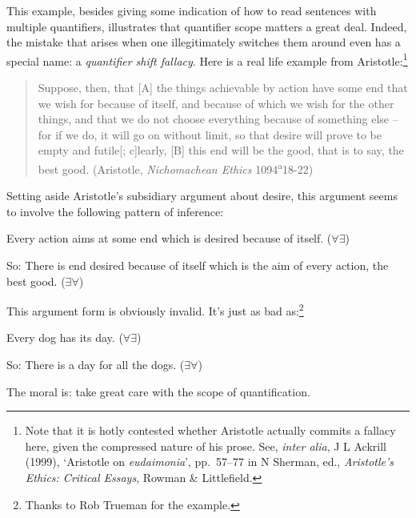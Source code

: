 This example, besides giving some indication of how to read sentences with multiple quantifiers, illustrates that quantifier scope matters a great deal. Indeed, the mistake that arises when one illegitimately switches them around even has a special name: a \emph{quantifier shift fallacy}. Here is a real life example from Aristotle:\footnote{Note that it is hotly contested whether Aristotle actually commits a fallacy here, given the compressed nature of his prose. See, \emph{inter alia}, J L Ackrill (1999), `Aristotle on \emph{eudaimonia}', pp.\ 57–77 in N Sherman, ed., \emph{Aristotle’s Ethics: Critical Essays}, Rowman \& Littlefield.} \begin{quote}
	Suppose, then, that [A] the things achievable by action have some end that we wish for because of itself, and because of which we wish for the other things, and that we do not choose everything because of something else – for if we do, it will go on without limit, so that desire will prove to be empty and futile[; c]learly, [B] this end will be the good, that is to say, the best good. (Aristotle,  \emph{Nichomachean Ethics} 1094\textsuperscript{a}18-22)
\end{quote} Setting aside Aristotle's subsidiary argument about desire, this argument seems to involve the following pattern of inference: \begin{earg}
		\item[] Every action aims at some end which is desired because of itself. \hfill ($\forall \exists$)
		\item[So:] There is end desired because of itself which is the aim of every action, the best good. \hfill ($\exists \forall$)
	\end{earg}
This argument form is obviously invalid. It's just as bad as:\footnote{Thanks to Rob Trueman for the example.}
	\begin{earg}
		\item[] Every dog has its day. \hfill ($\forall \exists$)
		\item[So:] There is a day for all the dogs. \hfill ($\exists \forall$)
	\end{earg}
The moral is: take great care with the scope of quantification. 



